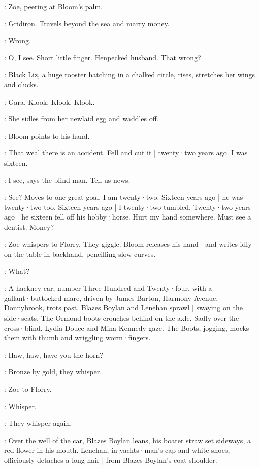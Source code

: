 :
Zoe,
peering at Bloom's palm.

\Zoe:
Gridiron.
Travels beyond the sea and marry money.

\Bloom:
Wrong.

\Zoe:
O,
I see.
Short little finger.
Henpecked husband.
That wrong?

:
Black Liz,
a huge rooster hatching in a chalked circle,
rises,
stretches her wings and clucks.

\BlackLiz:
Gara.
Klook.
Klook.
Klook.

:
She sidles from her newlaid egg and waddles off.

:
Bloom points to his hand.

\Bloom:
That weal there is an accident.
Fell and cut it |
twenty·two years ago.
I was sixteen.

\Zoe:
I see,
says the blind man.
Tell us news.

\Stephen:
See?
Moves to one great goal.
I am twenty·two.
Sixteen years ago |
he was twenty·two too.
Sixteen years ago |
I twenty·two tumbled.
Twenty·two years ago |
he sixteen fell off his hobby·horse.
Hurt my hand somewhere.
Must see a dentist.
Money?

:
Zoe whispers to Florry.
They giggle.
Bloom releases his hand |
and writes idly on the table in backhand,
pencilling slow curves.

\Florry:
What?


:
A hackney car,
number Three Hundred and Twenty·four,
with a gallant·butt\-ocked mare,
driven by James Barton,
Harmony Avenue,
Donnybrook,
trots past.
Blazes Boylan and Lenehan sprawl |
swaying on the side·seats.
The Ormond boots crouches behind on the axle.
%
Sadly over the cross·blind,
Lydia Douce and Mina Kennedy gaze.
The Boots,
jogging,
mocks them with thumb and wriggling worm·fingers.

\Boots:
Haw,
haw,
have you the horn?

:
Bronze by gold,
they whisper.

:
Zoe to Florry.

\Zoe:
Whisper.

:
They whisper again.

:
Over the well of the car,
Blazes Boylan leans,
his boater straw set sideways,
a red flower in his mouth.
Lenehan,
in yachts·man's cap and white shoes,
%
officiously detaches a long hair |
from Blazes Boylan's coat shoulder.

